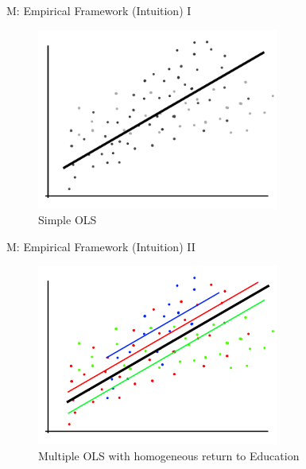 \documentclass[10pt,ignorenonframetext,]{beamer}
\begin{document}
\begin{frame}{M: Empirical Framework (Intuition) I}
\protect\hypertarget{m-empirical-framework-intuition-i}{}

\begin{figure}
\centering
\includegraphics[width=3.125in,height=\textheight]{img/rcmodel001.png}
\caption{Simple OLS}
\end{figure}

\end{frame}

\begin{frame}{M: Empirical Framework (Intuition) II}
\protect\hypertarget{m-empirical-framework-intuition-ii}{}

\begin{figure}
\centering
\includegraphics[width=3.125in,height=\textheight]{img/rcmodel002.png}
\caption{Multiple OLS with homogeneous return to Education}
\end{figure}

\end{frame}
\end{document}
